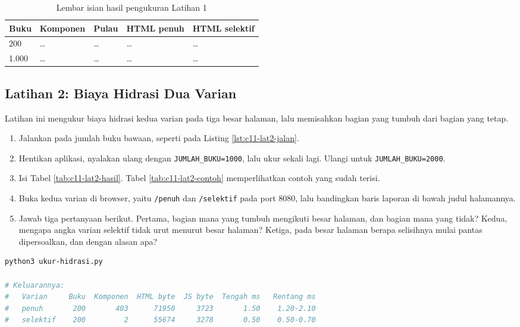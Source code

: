 \begin{table}[!htb]
  \centering
  \caption{Lembar isian hasil pengukuran Latihan 1}
  \label{tab:c11-lat1-hasil}
  \begin{tabularx}{\textwidth}{Xllll}
    \hline
    \textbf{Buku} & \textbf{Komponen} & \textbf{Pulau} & \textbf{HTML penuh} & \textbf{HTML selektif} \\
    \hline
    200 & \dots & \dots & \dots & \dots \\
    \hline
    1.000 & \dots & \dots & \dots & \dots \\
    \hline
  \end{tabularx}
\end{table}

\subsection*{Latihan 2: Biaya Hidrasi Dua Varian}

Latihan ini mengukur biaya hidrasi kedua varian pada tiga besar halaman, lalu
memisahkan bagian yang tumbuh dari bagian yang tetap.

\begin{enumerate}
  \item Jalankan  pada jumlah buku bawaan, seperti
        pada Listing \ref{lst:c11-lat2-jalan}.
  \item Hentikan aplikasi, nyalakan ulang dengan
        \texttt{JUMLAH\_BUKU=1000}, lalu ukur sekali lagi. Ulangi untuk
        \texttt{JUMLAH\_BUKU=2000}.
  \item Isi Tabel \ref{tab:c11-lat2-hasil}. Tabel \ref{tab:c11-lat2-contoh}
        memperlihatkan contoh yang sudah terisi.
  \item Buka kedua varian di browser, yaitu \texttt{/penuh} dan
        \texttt{/selektif} pada port 8080, lalu bandingkan baris laporan di
        bawah judul halamannya.
  \item Jawab tiga pertanyaan berikut. Pertama, bagian mana yang tumbuh
        mengikuti besar halaman, dan bagian mana yang tidak? Kedua, mengapa
        angka varian selektif tidak urut menurut besar halaman? Ketiga, pada
        besar halaman berapa selisihnya mulai pantas dipersoalkan, dan dengan
        alasan apa?
\end{enumerate}

\begin{lstlisting}[language=bash, caption={Mengukur biaya hidrasi lima kali tiap varian, tersedia di \berkas{sources/chapter11/ukur-hidrasi.py}}, label={lst:c11-lat2-jalan}]
python3 ukur-hidrasi.py

# Keluarannya:
#   Varian     Buku  Komponen  HTML byte  JS byte  Tengah ms   Rentang ms
#   penuh       200       403      71950     3723       1.50    1.20-2.10
#   selektif    200         2      55674     3278       0.50    0.50-0.70
\end{lstlisting}

